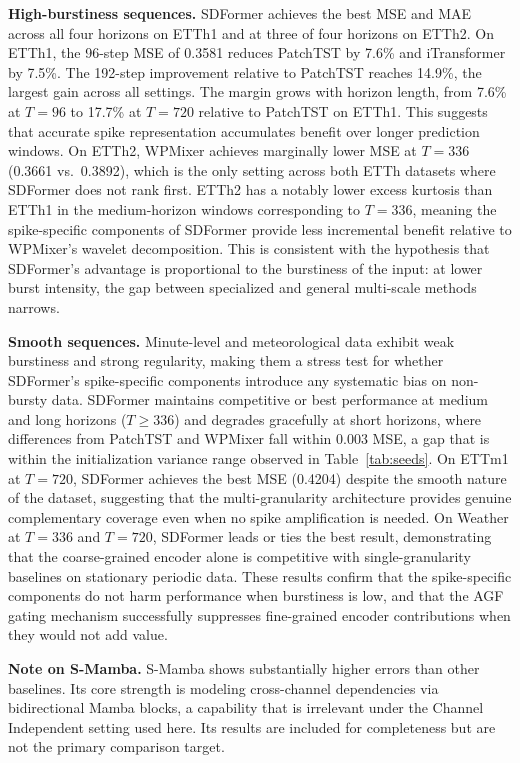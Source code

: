 \documentclass[journal]{IEEEtran}
\begin{document}
\textbf{High-burstiness sequences.}
SDFormer achieves the best MSE and MAE across all four horizons on ETTh1 and
at three of four horizons on ETTh2.
On ETTh1, the 96-step MSE of 0.3581 reduces PatchTST by 7.6\% and
iTransformer by 7.5\%.
The 192-step improvement relative to PatchTST reaches 14.9\%, the largest
gain across all settings.
The margin grows with horizon length, from 7.6\% at $T=96$ to 17.7\% at
$T=720$ relative to PatchTST on ETTh1.
This suggests that accurate spike representation accumulates benefit over
longer prediction windows.
On ETTh2, WPMixer achieves marginally lower MSE at $T=336$ (0.3661 vs.\
0.3892), which is the only setting across both ETTh datasets where SDFormer
does not rank first.
ETTh2 has a notably lower excess kurtosis than ETTh1 in the medium-horizon
windows corresponding to $T=336$, meaning the spike-specific components of
SDFormer provide less incremental benefit relative to WPMixer's wavelet
decomposition.
This is consistent with the hypothesis that SDFormer's advantage is
proportional to the burstiness of the input: at lower burst intensity,
the gap between specialized and general multi-scale methods narrows.

\textbf{Smooth sequences.}
Minute-level and meteorological data exhibit weak burstiness and strong
regularity, making them a stress test for whether SDFormer's spike-specific
components introduce any systematic bias on non-bursty data.
SDFormer maintains competitive or best performance at medium and long
horizons ($T \geq 336$) and degrades gracefully at short horizons, where
differences from PatchTST and WPMixer fall within 0.003 MSE, a gap that is
within the initialization variance range observed in Table~\ref{tab:seeds}.
On ETTm1 at $T=720$, SDFormer achieves the best MSE (0.4204) despite the
smooth nature of the dataset, suggesting that the multi-granularity
architecture provides genuine complementary coverage even when no spike
amplification is needed.
On Weather at $T=336$ and $T=720$, SDFormer leads or ties the best result,
demonstrating that the coarse-grained encoder alone is competitive with
single-granularity baselines on stationary periodic data.
These results confirm that the spike-specific components do not harm
performance when burstiness is low, and that the AGF gating mechanism
successfully suppresses fine-grained encoder contributions when they
would not add value.

\textbf{Note on S-Mamba.}
S-Mamba shows substantially higher errors than other baselines.
Its core strength is modeling cross-channel dependencies via bidirectional
Mamba blocks, a capability that is irrelevant under the Channel Independent
setting used here.
Its results are included for completeness but are not the primary comparison
target.
\end{document}
